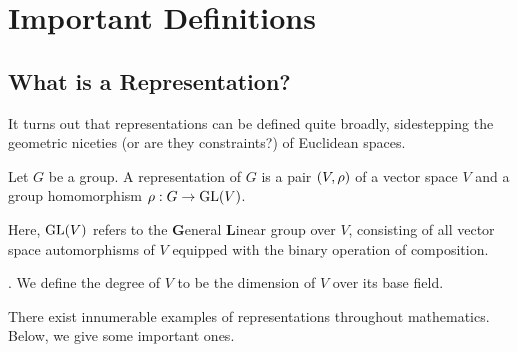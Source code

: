 \section{Important Definitions}



\subsection{What is a Representation?}

It turns out that representations can be defined quite broadly, sidestepping the geometric niceties (or are they constraints?) of Euclidean spaces.

\begin{boxdefinition}
    Let $G$ be a group. A representation of $G$ is a pair $\left( V, \rho \right)$ of a vector space $V$ and a group homomorphism $\rho : G \to \operatorname{GL}\!\left( V \right)$.
\end{boxdefinition}

Here, $\operatorname{GL}\!\left( V \right)$ refers to the \textbf{G}eneral \textbf{L}inear group over $V$, consisting of all vector space automorphisms of $V$ equipped with the binary operation of composition.

\begin{definition}
    . We define the degree of $V$ to be the dimension of $V$ over its base field.
\end{definition}

There exist innumerable examples of representations throughout mathematics. Below, we give some important ones.

